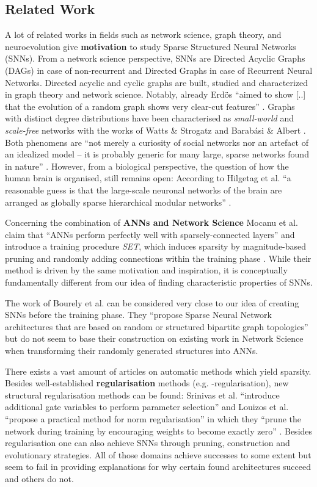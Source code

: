 \documentclass[runningheads]{llncs}
\begin{document}
\subsection*{Related Work}
A lot of related works in fields such as network science, graph theory, and neuroevolution give \textbf{motivation} to study Sparse Structured Neural Networks (SNNs).
From a network science perspective, SNNs are Directed Acyclic Graphs (DAGs) in case of non-recurrent and Directed Graphs in case of Recurrent Neural Networks.
Directed acyclic and cyclic graphs are built, studied and characterized in graph theory and network science.
Notably, already Erd{\"o}s ``aimed to show [..] that the evolution of a random graph shows very clear-cut features'' \cite{erds1960evolution}.
Graphs with distinct degree distributions have been characterised as \textit{small-world} and \textit{scale-free} networks with the works of Watts \& Strogatz \cite{watts1998collective} and Barab{\'a}si \& Albert \cite{albert2002statistical}.
Both phenomens are ``not merely a curiosity of social networks nor an artefact of an idealized model -- it is probably generic for many large, sparse networks found in nature'' \cite{watts1998collective}.
However, from a biological perspective, the question of how the human brain is organised, still remains open:
According to Hilgetag et al. ``a reasonable guess is that the large-scale neuronal networks of the brain are arranged as globally sparse hierarchical modular networks'' \cite{hilgetag2016brain}.

Concerning the combination of \textbf{ANNs and Network Science} Mocanu et al. claim that ``ANNs perform perfectly well with sparsely-connected layers'' and introduce a training procedure \textit{SET}, which induces sparsity by magnitude-based pruning and randomly adding connections within the training phase \cite{mocanu2017evolutionary}.
While their method is driven by the same motivation and inspiration, it is conceptually fundamentally different from our idea of finding characteristic properties of SNNs.

The work of Bourely et al. can be considered very close to our idea of creating SNNs before the training phase.
They ``propose Sparse Neural Network architectures that are based on random or structured bipartite graph topologies'' \cite{bourely2017sparse} but do not seem to base their construction on existing work in Network Science when transforming their randomly generated structures into ANNs.

There exists a vast amount of articles on automatic methods which yield sparsity.
Besides well-established \textbf{regularisation} methods (e.g. -regularisation), new structural regularisation methods can be found:
Srinivas et al. ``introduce additional gate variables to perform parameter selection'' \cite{srinivas2017training} and Louizos et al. ``propose a practical method for  norm regularisation'' in which they ``prune the network during training by encouraging weights to become exactly zero'' \cite{louizos2017learning}.
Besides regularisation one can also achieve SNNs through pruning, construction and evolutionary strategies.
All of those domains achieve successes to some extent but seem to fail in providing explanations for why certain found architectures succeed and others do not.
\end{document}
